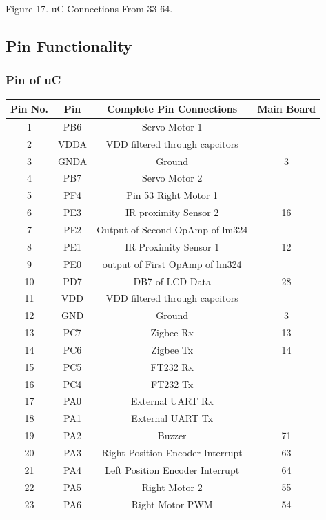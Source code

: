 \documentclass[a4paper,10pt,oneside]{article}
\begin{document}
{\begin{center}
		Figure 17. uC Connections From 33-64.\\
	\end{center}
	\subsection{\textbf{Pin Functionality}}
		\subsubsection{\textbf{Pin of uC}}
			\begin{longtable}{|c|c|c|c|}\hline
				Pin No.&Pin & 	Complete Pin Connections&Main Board\\ \hline
				1 &		PB6	&	Servo Motor 1&\\ \hline
				2 &		VDDA&	VDD filtered through capcitors&\\ \hline
				3 &		GNDA&	Ground&3\\ \hline
				4 &		PB7 &	Servo Motor 2&\\ \hline
				5 & 	PF4 &	Pin 53 Right Motor 1&\\ \hline
				6 &		PE3	&	IR proximity Sensor 2&16\\ \hline
				7 &		PE2 &	Output of Second OpAmp of lm324&\\ \hline
				8 &		PE1 &	IR Proximity Sensor 1 & 12\\ \hline
				9 &		PE0 &	output of First OpAmp of lm324&\\ \hline
				10 &	PD7 &	DB7 of LCD Data&28\\ \hline
				11 &	VDD &	VDD filtered through capcitors&\\ \hline
				12 &	GND	&	Ground&3\\ \hline
				13 &	PC7	&	Zigbee Rx&13\\ \hline
				14 &	PC6	&	Zigbee Tx&14\\ \hline
				15 & 	PC5	&	FT232 Rx&\\ \hline
				16 & 	PC4 &	FT232 Tx&\\ \hline 
				17 &	PA0 &	External UART Rx&\\ \hline
				18 &	PA1 &	External UART Tx&\\ \hline
				19 &	PA2 &	Buzzer&71\\ \hline
				20 &	PA3 &	Right Position Encoder Interrupt&63\\ \hline
				21 &	PA4	 &	Left Position Encoder Interrupt&64\\ \hline
				22 &	PA5 &	Right Motor 2&55\\ \hline
				23 &	PA6 &	Right Motor PWM&54\\ \hline

\end{longtable}}
\end{document}
